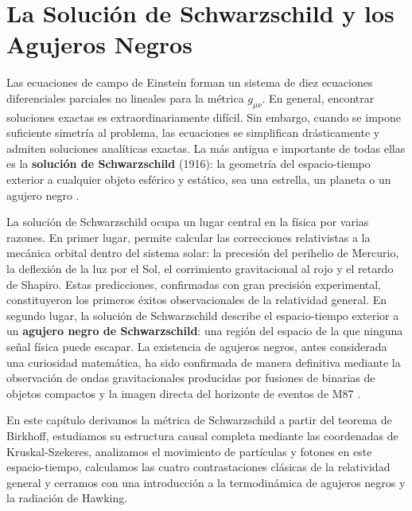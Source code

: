 
\chapter{La Solución de Schwarzschild y los Agujeros Negros}
\label{cap:schwarzschild}

Las ecuaciones de campo de Einstein forman un sistema de diez ecuaciones diferenciales parciales no lineales para la métrica $g_{\mu\nu}$. En general, encontrar soluciones exactas es extraordinariamente difícil. Sin embargo, cuando se impone suficiente simetría al problema, las ecuaciones se simplifican drásticamente y admiten soluciones analíticas exactas. La más antigua e importante de todas ellas es la \textbf{solución de Schwarzschild} (1916): la geometría del espacio-tiempo exterior a cualquier objeto esférico y estático, sea una estrella, un planeta o un agujero negro \cite{Schwarzschild1916, Carroll2004, Misner1973, Wald1984}.

La solución de Schwarzschild ocupa un lugar central en la física por varias razones. En primer lugar, permite calcular las correcciones relativistas a la mecánica orbital dentro del sistema solar: la precesión del perihelio de Mercurio, la deflexión de la luz por el Sol, el corrimiento gravitacional al rojo y el retardo de Shapiro. Estas predicciones, confirmadas con gran precisión experimental, constituyeron los primeros éxitos observacionales de la relatividad general. En segundo lugar, la solución de Schwarzschild describe el espacio-tiempo exterior a un \textbf{agujero negro de Schwarzschild}: una región del espacio de la que ninguna señal física puede escapar. La existencia de agujeros negros, antes considerada una curiosidad matemática, ha sido confirmada de manera definitiva mediante la observación de ondas gravitacionales producidas por fusiones de binarias de objetos compactos \cite{Abbott2016prl} y la imagen directa del horizonte de eventos de M87 \cite{EHT2019}.

En este capítulo derivamos la métrica de Schwarzschild a partir del teorema de Birkhoff, estudiamos su estructura causal completa mediante las coordenadas de Kruskal-Szekeres, analizamos el movimiento de partículas y fotones en este espacio-tiempo, calculamos las cuatro contrastaciones clásicas de la relatividad general y cerramos con una introducción a la termodinámica de agujeros negros y la radiación de Hawking.

